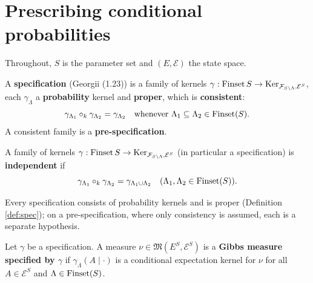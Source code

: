 \section{Prescribing conditional probabilities}

Throughout, $S$ is the parameter set and $(E, \mathcal{E})$ the state space.

\begin{definition}[Specification]
    \label{def:spec}
    \leanok{}

    A {\bf specification} (Georgii (1.23)) is a family of kernels
    $\gamma : \operatorname{Finset} S \to \operatorname{Ker}_{\mathcal{F}_{S\setminus\Lambda}, \mathcal{E}^S}$, each
    $\gamma_\Lambda$ a {\bf probability} kernel and {\bf proper}, which is {\bf consistent}:
    \[\gamma_{\Lambda_1} \circ_k \gamma_{\Lambda_2} = \gamma_{\Lambda_2}
      \quad \text{whenever } \Lambda_1 \subseteq \Lambda_2 \in \operatorname{Finset}(S).\]
    A consistent family is a {\bf pre-specification}.
\end{definition}

\begin{definition}
    \label{def:indep-spec}
    \leanok{}

    A family of kernels $\gamma : \operatorname{Finset} S \to \operatorname{Ker}_{\mathcal{F}_{S\setminus\Lambda}, \mathcal{E}^S}$
    (in particular a specification) is \textbf{independent} if
    \[\gamma_{\Lambda_1} \circ_k \gamma_{\Lambda_2} = \gamma_{\Lambda_1\cup\Lambda_2}
      \quad (\Lambda_1, \Lambda_2 \in \operatorname{Finset}(S)).\]
\end{definition}

\begin{remark}
    \label{def:markov-spec}
    \leanok{}

    Every specification consists of probability kernels and is proper (Definition
    \ref{def:spec}); on a pre-specification, where only consistency is assumed, each is a
    separate hypothesis.
\end{remark}

\begin{definition}
    \label{def:gibbs-meas}
    \leanok

    Let $\gamma$ be a specification. A measure $\nu \in \mathfrak{M}(E^S, \mathcal{E}^S)$ is a
    \textbf{Gibbs measure specified by $\gamma$} if $\gamma_\Lambda(A \mid \cdot)$ is a
    conditional expectation kernel for $\nu$ for all $A \in \mathcal E^S$ and
    $\Lambda \in \operatorname{Finset}(S)$.
\end{definition}

